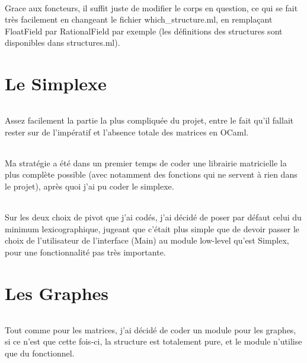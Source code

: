 \documentclass[a4paper]{article}
\begin{document}
\paragraph{}
Grace aux foncteurs, il suffit juste de modifier le corps en question, ce qui se fait très facilement en changeant le fichier which\_structure.ml, en remplaçant FloatField par RationalField par exemple (les définitions des structures sont disponibles dans structures.ml).

\part{Le Simplexe}

\paragraph{}
Assez facilement la partie la plus compliquée du projet, entre le fait qu'il fallait rester sur de l'impératif et l'absence totale des matrices en OCaml.

\paragraph{}
Ma stratégie a été dans un premier temps de coder une librairie matricielle la plus complète possible (avec notamment des fonctions qui ne servent à rien dans le projet), après quoi j'ai pu coder le simplexe.

\paragraph{}
Sur les deux choix de pivot que j'ai codés, j'ai décidé de poser par défaut celui du minimum lexicographique, jugeant que c'était plus simple que de devoir passer le choix de l'utilisateur de l'interface (Main) au module low-level qu'est Simplex, pour une fonctionnalité pas très importante.

\part{Les Graphes}

\paragraph{}
Tout comme pour les matrices, j'ai décidé de coder un module pour les graphes, si ce n'est que cette fois-ci, la structure est totalement pure, et le module n'utilise que du fonctionnel.
\end{document}
